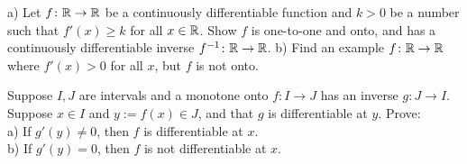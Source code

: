 \begin{exercise}
a) Let $f \colon {\mathbb{R}} \to {\mathbb{R}}$ be a continuously differentiable function
and $k > 0$ be a number such that $f'(x) \geq k$ for all $x \in {\mathbb{R}}$.
Show $f$ is one-to-one and onto, and has a continuously differentiable
inverse $f^{-1} \colon {\mathbb{R}} \to {\mathbb{R}}$. b) Find an example $f \colon {\mathbb{R}} \to {\mathbb{R}}$
where $f'(x) > 0$
for all $x$, but $f$ is not onto.
\end{exercise}

\begin{exercise}
Suppose $I,J$ are intervals and a monotone onto $f \colon I \to J$ has an inverse $g \colon J \to I$.
Suppose $x \in I$ and $y := f(x) \in J$, and that $g$ is differentiable at
$y$.  Prove:
\\
a) If $g'(y) \not= 0$, then $f$ is differentiable at $x$.
\\
b) If $g'(y) = 0$, then $f$ is not differentiable at $x$.
\end{exercise}
